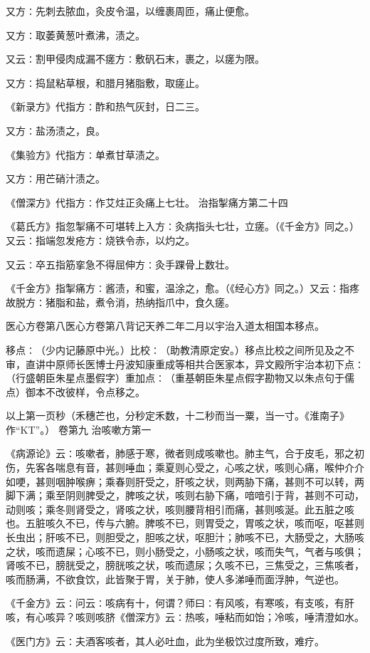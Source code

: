 \documentclass[a4paper,12pt,UTF8,twoside]{ctexbook}
\begin{document}
又方∶先刺去脓血，灸皮令温，以缠裹周匝，痛止便愈。

又方∶取萎黄葱叶煮沸，渍之。

又云∶割甲侵肉成漏不瘥方∶敷矾石末，裹之，以瘥为限。

又方∶捣鼠粘草根，和腊月猪脂敷，取瘥止。

《新录方》代指方∶酢和热气灰封，日二三。

又方∶盐汤渍之，良。

《集验方》代指方∶单煮甘草渍之。

又方∶用芒硝汁渍之。

《僧深方》代指方∶作艾炷正灸痛上七壮。
治指掣痛方第二十四

《葛氏方》指忽掣痛不可堪转上入方∶灸病指头七壮，立瘥。（《千金方》同之。）又云∶指端忽发疮方∶烧铁令赤，以灼之。

又云∶卒五指筋挛急不得屈伸方∶灸手踝骨上数壮。

《千金方》指掣痛方∶酱渍，和蜜，温涂之，愈。（《经心方》同之。）又云∶指疼故脱方∶猪脂和盐，煮令消，热纳指爪中，食久瘥。

医心方卷第八医心方卷第八背记天养二年二月以宇治入道太相国本移点。

移点∶（少内记藤原中光。）比校∶（助教清原定安。）移点比校之间所见及之不审，直讲中原师长医博士丹波知康重成等相共合医家本，异文殿所宇治本初下点∶（行盛朝臣朱星点墨假字）重加点∶（重基朝臣朱星点假字勘物又以朱点句于儒点）御本不改彼样，令点移之。

以上第一页秒（禾穗芒也，分秒定禾数，十二秒而当一粟，当一寸。《淮南子》作“KT”。）
卷第九
治咳嗽方第一

《病源论》云∶咳嗽者，肺感于寒，微者则成咳嗽也。肺主气，合于皮毛，邪之初伤，先客各喘息有音，甚则唾血；乘夏则心受之，心咳之状，咳则心痛，喉仲介介如哽，甚则咽肿喉痹；乘春则肝受之，肝咳之状，则两胁下痛，甚则不可以转，两脚下满；乘至阴则脾受之，脾咳之状，咳则右胁下痛，喑喑引于背，甚则不可动，动则咳；乘冬则肾受之，肾咳之状，咳则腰背相引而痛，甚则咳涎。此五脏之咳也。五脏咳久不已，传与六腑。脾咳不已，则胃受之，胃咳之状，咳而呕，呕甚则长虫出；肝咳不已，则胆受之，胆咳之状，呕胆汁；肺咳不已，大肠受之，大肠咳之状，咳而遗屎；心咳不已，则小肠受之，小肠咳之状，咳而失气，气者与咳俱；肾咳不已，膀胱受之，膀胱咳之状，咳而遗尿；久咳不已，三焦受之，三焦咳者，咳而肠满，不欲食饮，此皆聚于胃，关于肺，使人多涕唾而面浮肿，气逆也。

《千金方》云∶问云∶咳病有十，何谓？师曰∶有风咳，有寒咳，有支咳，有肝咳，有心咳异？咳则咳脐《僧深方》云∶热咳，唾粘而如饴；冷咳，唾清澄如水。

《医门方》云∶夫酒客咳者，其人必吐血，此为坐极饮过度所致，难疗。
\end{document}
